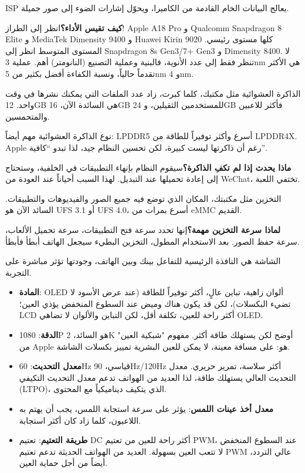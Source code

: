 
ISP يعالج البيانات الخام القادمة من الكاميرا، ويحوّل إشارات الضوء إلى صور جميلة.

\textbf{كيف تقيس الأداء؟}انظر إلى الطراز! Apple A18 Pro و Qualcomm Snapdragon 8 Elite و MediaTek Dimensity 9400 و Huawei Kirin 9020 كلها مستوى رئيسي. المستوى المتوسط انظر إلى Snapdragon 8s Gen3/7+ Gen3 و Dimensity 8400. لا تنظر فقط إلى عدد الأنوية، فالبنية وعملية التصنيع (النانومتر) أهم. عملية 3nm هي الأكثر تقدماً حالياً، ونسبة الكفاءة أفضل بكثير من 5nm و 4nm.


الذاكرة العشوائية مثل مكتبك، كلما كبرت، زاد عدد الملفات التي يمكنك نشرها في وقت واحد. 12GB هي السائدة الآن، 16GB للمستخدمين الثقيلين، و 24GB فأكثر للاعبين والمتحمسين.

نوع الذاكرة العشوائية مهم أيضاً: LPDDR5 أسرع وأكثر توفيراً للطاقة من LPDDR4X. Apple رغم أن ذاكرتها ليست كبيرة، لكن تحسين النظام جيد، لذا تبدو “كافية”.

\textbf{ماذا يحدث إذا لم تكفِ الذاكرة؟}سيقوم النظام بإنهاء التطبيقات في الخلفية، وستحتاج إلى إعادة تحميلها عند التبديل. لهذا السبب أحياناً عند العودة من WeChat، تختفي اللعبة.


التخزين مثل مكتبتك، المكان الذي توضع فيه جميع الصور والفيديوهات والتطبيقات. السائد الآن هو UFS 3.1 أو UFS 4.0، أسرع بمرات من eMMC القديم.

\textbf{لماذا سرعة التخزين مهمة؟}إنها تحدد سرعة فتح التطبيقات، سرعة تحميل الألعاب، سرعة حفظ الصور. بعد الاستخدام المطول، التخزين البطيء سيجعل الهاتف أبطأ فأبطأ.


الشاشة هي النافذة الرئيسية للتفاعل بينك وبين الهاتف، وجودتها تؤثر مباشرة على التجربة.

\begin{itemize}
  \item \textbf{المادة}: OLED ألوان زاهية، تباين عالٍ، أكثر توفيراً للطاقة (عند عرض الأسود لا تضيء البكسلات)، لكن قد يكون هناك وميض عند السطوع المنخفض يؤذي العين؛ LCD أكثر راحة للعين، تكلفة أقل، لكن التباين والألوان لا تضاهي OLED.
  \item \textbf{الدقة}: 1080P هو السائد، 2K أوضح لكن يستهلك طاقة أكثر. مفهوم "شبكية العين" من Apple هو: على مسافة معينة، لا يمكن للعين البشرية تمييز بكسلات الشاشة.
  \item \textbf{معدل التحديث}: 60Hz قياسي، 90Hz/120Hz أكثر سلاسة، تمرير حريري. معدل التحديث العالي يستهلك طاقة، لذا العديد من الهواتف تدعم معدل التحديث التكيفي (LTPO)، الذي يتكيف ديناميكياً مع المحتوى.
  \item \textbf{معدل أخذ عينات اللمس}: يؤثر على سرعة استجابة اللمس، يجب أن يهتم به اللاعبون، كلما زاد كان أكثر استجابة.
  \item \textbf{طريقة التعتيم}: تعتيم DC أكثر راحة للعين من تعتيم PWM، عند السطوع المنخفض لا تتعب العين بسهولة. العديد من الهواتف الحديثة تدعم تعتيم PWM عالي التردد، أيضاً من أجل حماية العين.
\end{itemize}

